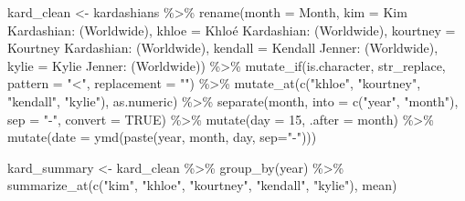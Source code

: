 \documentclass[
]{article}
\newenvironment{Shaded}{\begin{snugshade}}{\end{snugshade}}
\newcommand{\AttributeTok}[1]{\textcolor[rgb]{0.77,0.63,0.00}{#1}}
\newcommand{\ConstantTok}[1]{\textcolor[rgb]{0.00,0.00,0.00}{#1}}
\newcommand{\DecValTok}[1]{\textcolor[rgb]{0.00,0.00,0.81}{#1}}
\newcommand{\FunctionTok}[1]{\textcolor[rgb]{0.00,0.00,0.00}{#1}}
\newcommand{\NormalTok}[1]{#1}
\newcommand{\OtherTok}[1]{\textcolor[rgb]{0.56,0.35,0.01}{#1}}
\newcommand{\SpecialCharTok}[1]{\textcolor[rgb]{0.00,0.00,0.00}{#1}}
\newcommand{\StringTok}[1]{\textcolor[rgb]{0.31,0.60,0.02}{#1}}
\begin{document}
\begin{Shaded}
\begin{Highlighting}[]
\NormalTok{kard\_clean }\OtherTok{\textless{}{-}}\NormalTok{ kardashians }\SpecialCharTok{\%\textgreater{}\%}
  \FunctionTok{rename}\NormalTok{(}\AttributeTok{month =}\NormalTok{ Month,}
         \AttributeTok{kim =} \StringTok{\textasciigrave{}}\AttributeTok{Kim Kardashian: (Worldwide)}\StringTok{\textasciigrave{}}\NormalTok{,}
         \AttributeTok{khloe =} \StringTok{\textasciigrave{}}\AttributeTok{Khloé Kardashian: (Worldwide)}\StringTok{\textasciigrave{}}\NormalTok{,}
         \AttributeTok{kourtney =} \StringTok{\textasciigrave{}}\AttributeTok{Kourtney Kardashian: (Worldwide)}\StringTok{\textasciigrave{}}\NormalTok{,}
         \AttributeTok{kendall =} \StringTok{\textasciigrave{}}\AttributeTok{Kendall Jenner: (Worldwide)}\StringTok{\textasciigrave{}}\NormalTok{,}
         \AttributeTok{kylie =} \StringTok{\textasciigrave{}}\AttributeTok{Kylie Jenner: (Worldwide)}\StringTok{\textasciigrave{}}\NormalTok{) }\SpecialCharTok{\%\textgreater{}\%} 
  \FunctionTok{mutate\_if}\NormalTok{(is.character, str\_replace, }\AttributeTok{pattern =} \StringTok{"\textless{}"}\NormalTok{, }\AttributeTok{replacement =} \StringTok{""}\NormalTok{) }\SpecialCharTok{\%\textgreater{}\%} 
  \FunctionTok{mutate\_at}\NormalTok{(}\FunctionTok{c}\NormalTok{(}\StringTok{"khloe"}\NormalTok{, }\StringTok{"kourtney"}\NormalTok{, }\StringTok{"kendall"}\NormalTok{, }\StringTok{"kylie"}\NormalTok{), as.numeric) }\SpecialCharTok{\%\textgreater{}\%} 
  \FunctionTok{separate}\NormalTok{(month, }\AttributeTok{into =} \FunctionTok{c}\NormalTok{(}\StringTok{"year"}\NormalTok{, }\StringTok{"month"}\NormalTok{), }\AttributeTok{sep =} \StringTok{"{-}"}\NormalTok{, }\AttributeTok{convert =} \ConstantTok{TRUE}\NormalTok{) }\SpecialCharTok{\%\textgreater{}\%}
  \FunctionTok{mutate}\NormalTok{(}\AttributeTok{day =} \DecValTok{15}\NormalTok{, }\AttributeTok{.after =}\NormalTok{ month) }\SpecialCharTok{\%\textgreater{}\%}
  \FunctionTok{mutate}\NormalTok{(}\AttributeTok{date =} \FunctionTok{ymd}\NormalTok{(}\FunctionTok{paste}\NormalTok{(year, month, day, }\AttributeTok{sep=}\StringTok{"{-}"}\NormalTok{)))}

\NormalTok{kard\_summary }\OtherTok{\textless{}{-}}\NormalTok{ kard\_clean }\SpecialCharTok{\%\textgreater{}\%} 
  \FunctionTok{group\_by}\NormalTok{(year) }\SpecialCharTok{\%\textgreater{}\%} 
  \FunctionTok{summarize\_at}\NormalTok{(}\FunctionTok{c}\NormalTok{(}\StringTok{"kim"}\NormalTok{, }\StringTok{"khloe"}\NormalTok{, }\StringTok{"kourtney"}\NormalTok{, }\StringTok{"kendall"}\NormalTok{, }\StringTok{"kylie"}\NormalTok{), mean)}
\end{Highlighting}
\end{Shaded}
\end{document}

